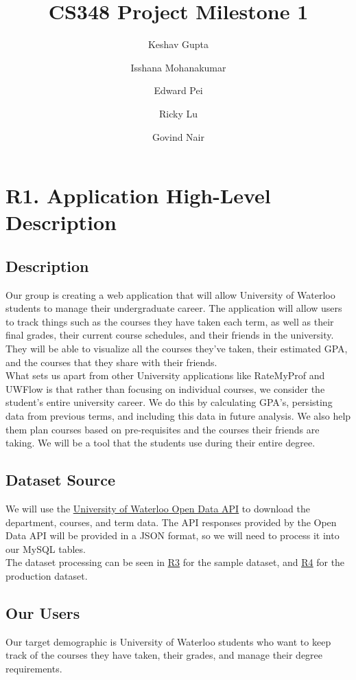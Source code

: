 \documentclass[12pt, a4paper]{article}
\title{CS348 Project Milestone 1}
\author{Keshav Gupta\and Isshana Mohanakumar \and Edward Pei \and Ricky Lu \and Govind Nair}
\begin{document}
\maketitle
\graphicspath{{./images/}}
\section*{R1. Application High-Level Description}
\label{sec:R1}
\subsection*{Description}
Our group is creating a web application that will allow University of Waterloo students to manage their undergraduate career. The application will allow users to track things such as the courses they have taken each term, as well as their final grades, their current course schedules, and their friends in the university. They will be able to visualize all the courses they've taken, their estimated GPA, and the courses that they share with their friends.\\

What sets us apart from other University applications like RateMyProf and UWFlow is that rather than focusing on individual courses, we consider the student's entire university career. We do this by calculating GPA's, persisting data from previous terms, and including this data in future analysis. We also help them plan courses based on pre-requisites and the courses their friends are taking. We will be a tool that the students use during their entire degree.

\subsection*{Dataset Source}
We will use the \underline{\href{https://openapi.data.uwaterloo.ca/api-docs/index.html}{University of Waterloo Open Data API}} to download the department, courses, and term data. The API responses provided by the Open Data API will be provided in a JSON format, so we will need to process it into our MySQL tables.\\

The dataset processing can be seen in \underline{\hyperref[sec:R3]{R3}} for the sample dataset, and \underline{\hyperref[sec:R4]{R4}} for the production dataset.

\subsection*{Our Users}
Our target demographic is University of Waterloo students who want to keep track of the courses they have taken, their grades, and manage their degree requirements.\\
\end{document}
